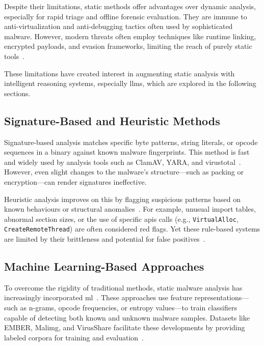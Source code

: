 Despite their limitations, static methods offer advantages over dynamic analysis, especially for
rapid triage and offline forensic evaluation. They are immune to anti-virtualization and
anti-debugging tactics often used by sophisticated malware. However, modern threats often employ
techniques like runtime linking, encrypted payloads, and evasion frameworks, limiting the reach of
purely static tools~\cite{fedak2020fundamentals, wong2021practice}.

These limitations have created interest in augmenting static analysis with intelligent reasoning
systems, especially \glspl{llm}, which are explored in the following sections.

\subsection{Signature-Based and Heuristic Methods}\label{subsec:StaticSignatureHeuristic}
Signature-based analysis matches specific byte patterns, string literals, or opcode sequences in a
binary against known malware fingerprints. This method is fast and widely used by analysis tools
such as ClamAV, YARA, and \gls{virustotal}~\cite{fedak2020fundamentals}. However, even slight
changes to the malware's structure—such as packing or encryption—can render signatures ineffective.

Heuristic analysis improves on this by flagging suspicious patterns based on known behaviours or
structural anomalies~\cite{patil2014computer}. For example, unusual import tables, abnormal section
sizes, or the use of specific \glspl{api} calls (e.g., \texttt{VirtualAlloc},
\texttt{CreateRemoteThread}) are often considered red flags. Yet these rule-based systems are
limited by their brittleness and potential for false positives~\cite{gaber2024malware,
	cassanova2022systematic}.

\subsection{Machine Learning-Based Approaches}\label{subsec:StaticMLApproaches}
To overcome the rigidity of traditional methods, static malware analysis has increasingly
incorporated \gls{ml}~\cite{cassanova2022systematic}. These approaches use feature
representations—such as n-grams, opcode frequencies, or entropy values—to train classifiers capable
of detecting both known and unknown malware samples. Datasets like EMBER, Malimg, and VirusShare
facilitate these developments by providing labeled corpora for training and
evaluation~\cite{gaber2024malware, anderson2018ember}.


